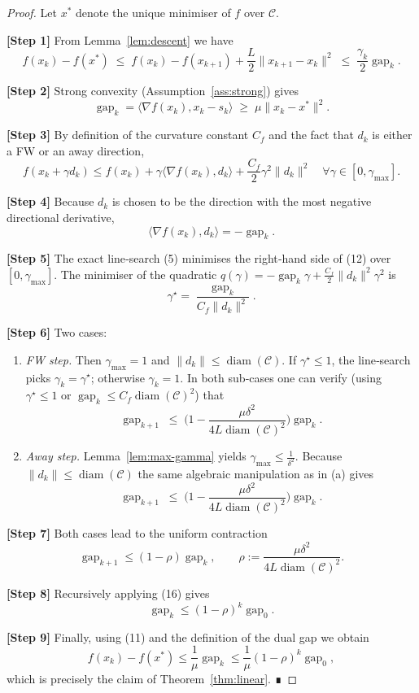\documentclass{article}
\newcommand{\C}{\mathcal{C}}
\newcommand{\gap}{\operatorname{gap}}
\newcommand{\diam}{\operatorname{diam}}
\begin{document}
\begin{proof}
Let $x^{*}$ denote the unique minimiser of $f$ over $\C$.  

\textbf{[Step 1]} From Lemma~\ref{lem:descent} we have
\[
f(x_{k})-f(x^{*})\;\le\; f(x_{k})-f(x_{k+1})+\frac{L}{2}\|x_{k+1}-x_{k}\|^{2}
\;\le\; \frac{\gamma_{k}}{2}\gap_{k}.
\tag{10}
\]

\textbf{[Step 2]} Strong convexity (Assumption~\ref{ass:strong}) gives
\[
\gap_{k}= \langle \nabla f(x_{k}),x_{k}-s_{k}\rangle
\;\ge\; \mu\|x_{k}-x^{*}\|^{2}.
\tag{11}
\]

\textbf{[Step 3]} By definition of the curvature constant $C_{f}$ and the fact that $d_{k}$ is either a FW or an away direction,
\[
f(x_{k}+\gamma d_{k})\le f(x_{k})+\gamma\langle \nabla f(x_{k}),d_{k}\rangle
+\frac{C_{f}}{2}\gamma^{2}\|d_{k}\|^{2}\quad\forall\gamma\in[0,\gamma_{\max}].
\tag{12}
\]

\textbf{[Step 4]} Because $d_{k}$ is chosen to be the direction with the most negative directional derivative,
\[
\langle \nabla f(x_{k}),d_{k}\rangle = -\gap_{k}.
\tag{13}
\]

\textbf{[Step 5]} The exact line‑search (5) minimises the right‑hand side of (12) over $[0,\gamma_{\max}]$.  The minimiser of the quadratic $q(\gamma)= -\gap_{k}\gamma + \frac{C_{f}}{2}\|d_{k}\|^{2}\gamma^{2}$ is
\[
\gamma^{\star}= \frac{\gap_{k}}{C_{f}\|d_{k}\|^{2}}.
\tag{14}
\]

\textbf{[Step 6]} Two cases:

\begin{enumerate}[label=(\alph*)]
\item \emph{FW step.} Then $\gamma_{\max}=1$ and $\|d_{k}\|\le \diam(\C)$.  
If $\gamma^{\star}\le 1$, the line‑search picks $\gamma_{k}=\gamma^{\star}$; otherwise $\gamma_{k}=1$. In both sub‑cases one can verify (using $\gamma^{\star}\le 1$ or $\gap_{k}\le C_{f}\diam(\C)^{2}$) that
\[
\gap_{k+1}\;\le\;\bigl(1-\frac{\mu\delta^{2}}{4L\diam(\C)^{2}}\bigr)\gap_{k}.
\tag{15a}
\]

\item \emph{Away step.} Lemma~\ref{lem:max-gamma} yields $\gamma_{\max}\le \frac{1}{\delta^{2}}$.  
Because $\|d_{k}\|\le \diam(\C)$ the same algebraic manipulation as in (a) gives
\[
\gap_{k+1}\;\le\;\bigl(1-\frac{\mu\delta^{2}}{4L\diam(\C)^{2}}\bigr)\gap_{k}.
\tag{15b}
\]
\end{enumerate}

\textbf{[Step 7]} Both cases lead to the uniform contraction
\[
\gap_{k+1}\le (1-\rho)\gap_{k},\qquad 
\rho:=\frac{\mu\delta^{2}}{4L\diam(\C)^{2}}.
\tag{16}
\]

\textbf{[Step 8]} Recursively applying (16) gives
\[
\gap_{k}\le (1-\rho)^{k}\gap_{0}.
\tag{17}
\]

\textbf{[Step 9]} Finally, using (11) and the definition of the dual gap we obtain
\[
f(x_{k})-f(x^{*})\le\frac{1}{\mu}\gap_{k}
\le\frac{1}{\mu}(1-\rho)^{k}\gap_{0},
\]
which is precisely the claim of Theorem~\ref{thm:linear}.  ∎
\end{proof}
\end{document}
